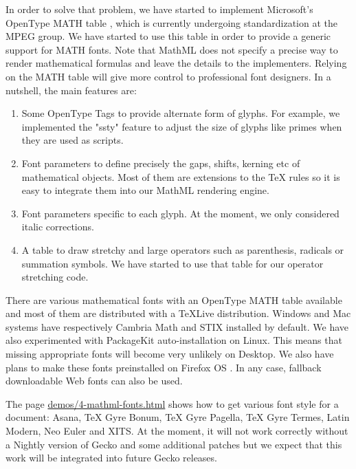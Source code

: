 In order to solve that problem, we have started to implement Microsoft's
OpenType MATH table \cite{OpenTypeMATHtable}, which is currently undergoing
standardization at the MPEG group.
We have started to use this table in order to provide a generic
support for MATH fonts. 
Note that MathML does not specify a precise way to render mathematical formulas
and leave the details to the implementers. Relying on the MATH table will give
more control to professional font designers.
In a nutshell, the main features are:

\begin{enumerate}

\item Some OpenType Tags to provide alternate form of glyphs. For example,
  we implemented the "ssty" feature to adjust the size of glyphs like primes
  when they are used as scripts.

\item Font parameters to define precisely the gaps, shifts, kerning etc of
  mathematical objects. Most of them are extensions to the TeX rules so it
  is easy to integrate them into our MathML rendering engine.

\item Font parameters specific to each glyph. At the moment, we only considered
  italic corrections.

\item A table to draw stretchy and large operators such as parenthesis,
  radicals or summation symbols. We have started to use that table for our
  operator stretching code.

\end{enumerate}

There are various mathematical fonts with an OpenType MATH table available and
most of them are distributed with a TeXLive distribution. Windows and Mac
systems have respectively Cambria Math and STIX installed by default. We have also
experimented with PackageKit auto-installation on Linux. This means that
missing appropriate fonts will become very unlikely on Desktop. We also have
plans to make these fonts preinstalled on Firefox OS
\cite{BugzillaFirefoxOSFonts}. In any case, fallback
downloadable Web fonts can also be used.

The page \href{http://fred-wang.github.io/MathUI2014/demos/4-mathml-fonts.html}{demos/4-mathml-fonts.html} shows how to get various font style for
a document: Asana, TeX Gyre Bonum, TeX Gyre Pagella, TeX Gyre Termes,
Latin Modern, Neo Euler and XITS. At the moment, it will not work correctly
without a Nightly version of Gecko and some additional patches but we expect
that this work will be integrated into future Gecko releases.

